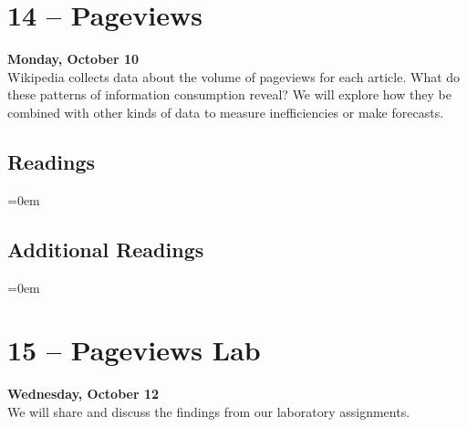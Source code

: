 \documentclass[10pt]{memoir}
\newenvironment{readinglist}{
\begin{list}{}{\leftmargin=8pt \itemindent=0em}
  \setlength{\itemsep}{8pt}
  \setlength{\parskip}{0em}
  \setlength{\parsep}{1em}
  \setlength{\parindent}{8em}}
{\end{list}}
\begin{document}
\section{14 -- Pageviews}
\textcolor{CUGold}{\textbf{Monday, October 10}}\\
Wikipedia collects data about the volume of pageviews for each article. What do these patterns of information consumption reveal? We will explore how they be combined with other kinds of data to measure inefficiencies or make forecasts.

    \subsection{Readings}
    \begin{readinglist}
        \item {}
        \item {}
    \end{readinglist}
    
    \subsection{Additional Readings}
    \begin{readinglist}
        \item {}
        \item {}
        \item {}
        \item {}
        \item {}
        \item {}
        \item {}
        \item {}
        \item {}
    \end{readinglist}

\section{15 -- Pageviews Lab}
\textcolor{CUGold}{\textbf{Wednesday, October 12}}\\
We will share and discuss the findings from our laboratory assignments.
\end{document}
